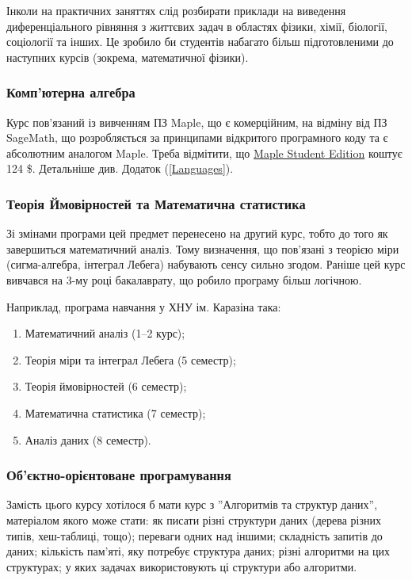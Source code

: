 \documentclass[14pt, a4paper]{extarticle}  %
\begin{document}
Інколи на практичних заняттях слід розбирати приклади на виведення диференціального рівняння з життєвих задач в областях фізики, хімії, біології, соціології та інших. Це зробило би студентів набагато більш підготовленими до наступних курсів (зокрема, математичної фізики). 

\subsubsection{Комп'ютерна алгебра}

Курс пов'язаний із вивченням ПЗ Maple, що є комерційним, на відміну від ПЗ SageMath, що розробляється за принципами відкритого програмного коду та є абсолютним аналогом Maple. Треба відмітити, що \href{https://webstore.maplesoft.com/catalog.aspx}{Maple Student Edition} коштує 124 \$. Детальніше див. Додаток (\ref{Languages}). 

\subsubsection{Теорія Ймовірностей та Математична статистика}

Зі змінами програми цей предмет перенесено на другий курс, тобто до того як завершиться математичний аналіз. Тому визначення, що пов'язані з теорією міри (сигма-алгебра, інтеграл Лебега) набувають сенсу сильно згодом. Раніше цей курс вивчався на 3-му році бакалаврату, що робило програму більш логічною. 

Наприклад, програма навчання у ХНУ ім. Каразіна така:
\begin{enumerate}
    \item Математичний аналіз (1--2 курс);
    \item Теорія міри та інтеграл Лебега (5 семестр);
    \item Теорія ймовірностей (6 семестр);
    \item Математична статистика (7 семестр);
    \item Аналіз даних (8 семестр).
\end{enumerate}

\subsubsection{Об'єктно-орієнтоване програмування}
 
Замість цього курсу хотілося б мати курс з ''Алгоритмів та структур даних'', матеріалом якого може стати: як писати різні структури даних (дерева різних типів, хеш-таблиці, тощо); переваги одних над іншими; складність запитів до даних; кількість пам'яті, яку потребує структура даних; різні алгоритми на цих структурах; у яких задачах використовують ці структури або алгоритми.
\end{document}
